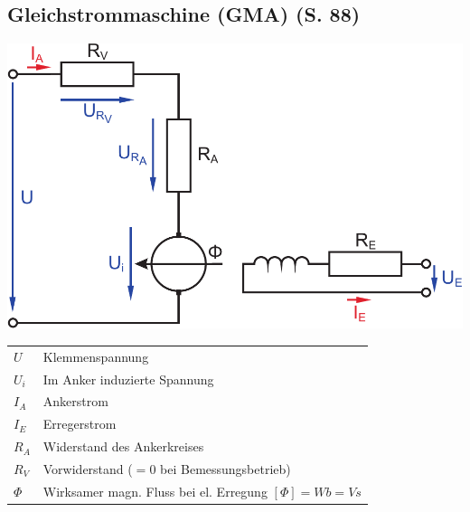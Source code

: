 \documentclass[a4paper,twocolumn,10pt]{article}
\begin{document}
\subsection{Gleichstrommaschine (GMA) (S. 88)}
\begin{center}
\includegraphics[width=0.95\columnwidth]{Grafiken/Gleichstrommaschine}
\end{center}
\begin{tabular}{ll}
$U$ & Klemmenspannung\\
$U_i$ & Im Anker induzierte Spannung\\
$I_A$ & Ankerstrom\\
$I_E$ & Erregerstrom\\
$R_A$ & Widerstand des Ankerkreises\\
$R_V$ & Vorwiderstand ($=0$ bei Bemessungsbetrieb)\\
$\Phi$ & Wirksamer magn. Fluss bei el. Erregung $[\Phi]=\si{Wb=Vs}$ 
\end{tabular}
\end{document}
